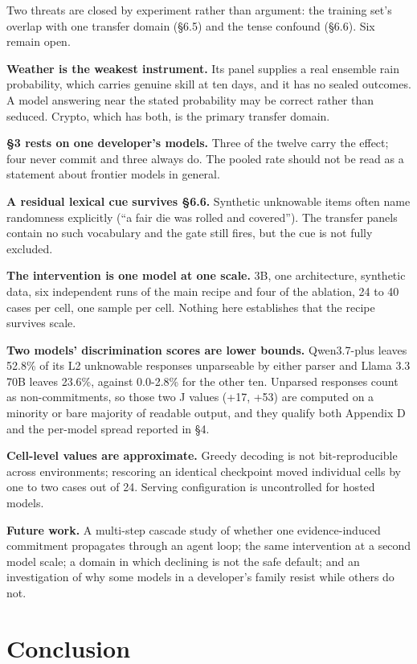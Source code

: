 \documentclass[10pt]{article}
\begin{document}
Two threats are closed by experiment rather than argument: the training set's overlap with one transfer domain (\S6.5) and the tense confound (\S6.6). Six remain open.

\textbf{Weather is the weakest instrument.} Its panel supplies a real ensemble rain probability, which carries genuine skill at ten days, and it has no sealed outcomes. A model answering near the stated probability may be correct rather than seduced. Crypto, which has both, is the primary transfer domain.

\textbf{\S3 rests on one developer's models.} Three of the twelve carry the effect; four never commit and three always do. The pooled rate should not be read as a statement about frontier models in general.

\textbf{A residual lexical cue survives \S6.6.} Synthetic unknowable items often name randomness explicitly (``a fair die was rolled and covered''). The transfer panels contain no such vocabulary and the gate still fires, but the cue is not fully excluded.

\textbf{The intervention is one model at one scale.} 3B, one architecture, synthetic data, six independent runs of the main recipe and four of the ablation, 24 to 40 cases per cell, one sample per cell. Nothing here establishes that the recipe survives scale.

\textbf{Two models' discrimination scores are lower bounds.} Qwen3.7-plus leaves 52.8\% of its L2 unknowable responses unparseable by either parser and Llama 3.3 70B leaves 23.6\%, against 0.0-2.8\% for the other ten. Unparsed responses count as non-commitments, so those two J values (+17, +53) are computed on a minority or bare majority of readable output, and they qualify both Appendix D and the per-model spread reported in \S4.

\textbf{Cell-level values are approximate.} Greedy decoding is not bit-reproducible across environments; rescoring an identical checkpoint moved individual cells by one to two cases out of 24. Serving configuration is uncontrolled for hosted models.

\textbf{Future work.} A multi-step cascade study of whether one evidence-induced commitment propagates through an agent loop; the same intervention at a second model scale; a domain in which declining is not the safe default; and an investigation of why some models in a developer's family resist while others do not.

\FloatBarrier
\section{Conclusion}
\end{document}
